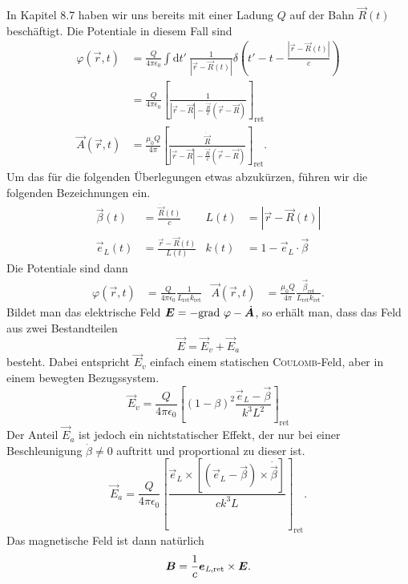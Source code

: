 In Kapitel 8.7 haben wir uns bereits mit einer Ladung $Q$ auf der Bahn $\vec{R}(t)$ beschäftigt. Die Potentiale in diesem Fall sind
\begin{align*}
\varphi(\vec{r},t) &= \frac{Q}{4\pi\epsilon_0} \int\mathrm{d}t'\ \frac{1}{|\vec{r}-\vec{R}(t)|}\delta\left(t'-t-\frac{|\vec{r}-\vec{R}(t)|}{c}\right)\\
&=\frac{Q}{4\pi\epsilon_0}
\left[\frac{1}{|\vec{r}-\vec{R}|-\frac{\dot{\vec{R}}}{c}(\vec{r}-\vec{R}) }\right]_\text{ret}\\
\vec{A}(\vec{r},t) &=\frac{\mu_0Q}{4\pi}
\left[\frac{\dot{\vec{R}}}{|\vec{r}-\vec{R}|-\frac{\dot{\vec{R}}}{c}(\vec{r}-\vec{R}) }\right]_\text{ret}.
\end{align*}
Um das für die folgenden Überlegungen etwas abzukürzen, führen wir die folgenden Bezeichnungen ein.
\begin{align*}
\vec{\beta}(t) &= \frac{\dot{\vec{R}}(t)}{c} & L(t)&=|\vec{r}-\vec{R}(t)|\\
\vec{e}_L(t) &=\frac{\vec{r}-\vec{R}(t)}{L(t)} &k(t) &=1-\vec{e}_L\cdot\vec{\beta}
\end{align*}
Die Potentiale sind dann
\begin{align*}
\varphi(\vec{r},t)&=\frac{Q}{4\pi\epsilon_0}\frac{1}{L_\text{ret}k_\text{ret}}
&\vec{A}(\vec{r},t) &= \frac{\mu_0 Q}{4\pi}\frac{\vec{\beta}_\text{ret}}{L_\text{ret}k_\text{ret}}.
\end{align*}
Bildet man das elektrische Feld $\vec{E}=-\grad\varphi -\dot{\vec{A}}$, so erhält man, dass das Feld aus zwei Bestandteilen 
\begin{equation*}
\vec{E} = \vec{E}_v + \vec{E}_a
\end{equation*}
besteht. Dabei entspricht $\vec{E}_v$ einfach einem statischen \textsc{Coulomb}-Feld, aber in einem bewegten Bezugssystem.
\begin{equation*}
\vec{E}_v = \frac{Q}{4\pi\epsilon_0}\left[(1-\beta)^2\frac{\vec{e}_L-\vec{\beta}}{k^3L^2}\right]_\text{ret}
\end{equation*}
Der Anteil $\vec{E}_a$ ist jedoch ein nichtstatischer Effekt, der nur bei einer Beschleunigung $\dot{\beta}\neq 0$ auftritt und proportional zu dieser ist.
\begin{equation*}
\vec{E}_a  =\frac{Q}{4\pi\epsilon_0}\left[\frac{\vec{e}_L\times\left[(\vec{e}_L-\vec{\beta})\times\dot{\vec{\beta}}\right]}{ck^3L}\right]_\text{ret}.
\end{equation*}
Das magnetische Feld ist dann natürlich
\begin{equation*}
\vec{B}=\frac{1}{c}\vec{e}_\text{\textit{L},ret}\times\vec{E}.
\end{equation*}
\ \\

